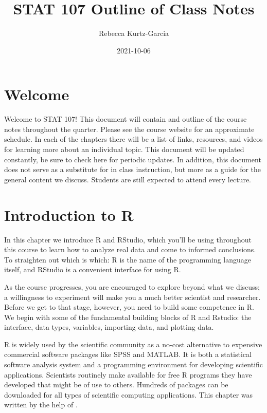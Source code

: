 \documentclass[
]{book}
\title{STAT 107 Outline of Class Notes}
\author{Rebecca Kurtz-Garcia}
\date{2021-10-06}
\begin{document}
\maketitle

{
\setcounter{tocdepth}{1}
\tableofcontents
}
\hypertarget{welcome}{%
\chapter*{Welcome}\label{welcome}}

Welcome to STAT 107! This document will contain and outline of the course notes throughout the quarter. Please see the course website for an approximate schedule. In each of the chapters there will be a list of links, resources, and videos for learning more about an individual topic. This document will be updated constantly, be sure to check here for periodic updates. In addition, this document does not serve as a substitute for in class instruction, but more as a guide for the general content we discuss. Students are still expected to attend every lecture.

\hypertarget{introduction-to-r}{%
\chapter{Introduction to R}\label{introduction-to-r}}

In this chapter we introduce R and RStudio, which you'll be using throughout this course to learn how to analyze real data and come to informed conclusions. To straighten out which is which: R is the name of the programming language itself, and RStudio is a convenient interface for using R.

As the course progresses, you are encouraged to explore beyond what we discuss; a willingness to experiment will make you a much better scientist and researcher. Before we get to that stage, however, you need to build some competence in R. We begin with some of the fundamental building blocks of R and Rstudio: the interface, data types, variables, importing data, and plotting data.

R is widely used by the scientific community as a no-cost alternative to expensive commercial software packages like SPSS and MATLAB. It is both a statistical software analysis system and a programming environment for developing scientific applications. Scientists routinely make available for free R programs they have developed that might be of use to others. Hundreds of packages can be downloaded for all types of scientific computing applications. This chapter was written by the help of \citet{Desharnais2020}.
\end{document}
